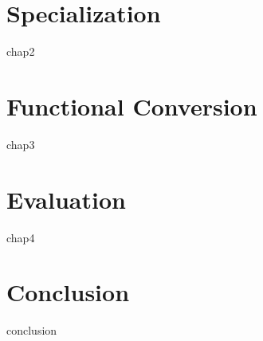 \documentclass[11pt,a4paper]{book}
\begin{document}
\chapter{Specialization}\label{chap:2}
{chap2}  

\chapter{Functional Conversion}\label{chap:3}
{chap3}

\chapter{Evaluation}\label{chap:4}
{chap4}


\chapter{Conclusion}\label{chap:conclusion}
{conclusion}

\backmatter




\cleardoublepage
{}
{}


  

\end{document}
